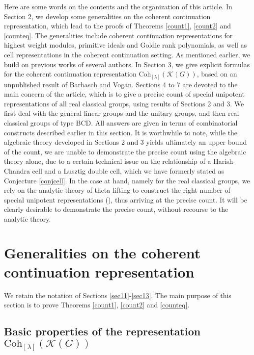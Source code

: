 \documentclass[12pt,a4paper]{amsart}
\newcommand{\CK}{{\mathcal {K}}}
\numberwithin{equation}{section}
\theoremstyle{remark}
\def\Coh{\mathrm{Coh}}
\newcommand{\Lam}{{[\lambda]}}
\begin{document}
Here are some words on the contents and the organization of this article. In Section 2, we develop some generalities on the coherent continuation representation, which lead to the proofs of Theorems \ref{count1}, \ref{count2} and \ref{counteq}. The generalities include coherent continuation representations for highest weight modules, primitive ideals and Goldie rank polynomials, as well as cell representations in the coherent continuation setting. As mentioned earlier, we build on previous works of several authors.
In Section 3, we give explicit formulas for the coherent continuation representation $\Coh_{\Lam}(\CK(G))$, based on an unpublished result of Barbasch and Vogan. Sections 4 to 7 are devoted to the main concern of the article, which is to give a precise count of special unipotent representations of all real classical groups, using results of Sections 2 and 3. We first deal with the general linear groups and the unitary groups, and then real classical groups of type $\mathrm{BCD}$. All answers are given in terms of combinatorial constructs described earlier in this section. It is worthwhile to note, while the algebraic theory developed in Sections 2 and 3 yields ultimately an upper bound of the count, we are unable to demonstrate the precise count using the algebraic theory alone, due to a certain technical issue on the relationship of a Harish-Chandra cell and a Lusztig double cell, which we have formerly stated as Conjecture \ref{conjcell}. In the case at hand, namely for the real classical groups, we rely on the analytic theory of theta lifting to construct the right number of special unipotent representations (\cite{BMSZ2}), thus arriving at the precise count. It will be clearly desirable to demonstrate the precise count, without recourse to the analytic theory.



\section{Generalities on the coherent continuation representation}
\label{sec:pfGeneral}
 We retain the notation of Sections \ref{sec11}-\ref{sec13}. The main purpose of this section is to prove Theorems \ref{count1}, \ref{count2} and \ref{counteq}.

\subsection{Basic properties of the representation $\Coh_{[\lambda]}(\CK(G))$}
\end{document}
